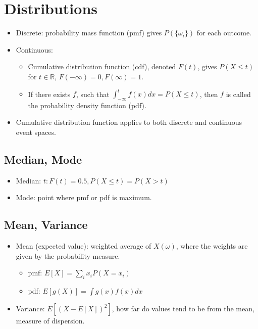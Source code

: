 \documentclass[letterpaper,10pt]{article}
\begin{document}
\section{Distributions}

\begin{itemize}
	\item Discrete: probability mass function (pmf) gives $P(\{\omega_i\})$ for each outcome.
	\item Continuous:
	\begin{itemize}
		\item Cumulative distribution function (cdf), denoted $F(t)$, gives $P(X \leq t)$ for $t\in\mathbb{R}$, $F(-\infty)=0, F(\infty)=1$.
		\item If there exists $f$, such that $\int_{-\infty}^{t}f(x)dx=P(X\leq t)$, then $f$ is called the probability density function (pdf).
	\end{itemize}
	\item Cumulative distribution function applies to both discrete and continuous event spaces.
\end{itemize}

\subsection{Median, Mode}

\begin{itemize}
	\item Median: $t:F(t)=0.5, P(X\leq t)=P(X>t)$
	\item Mode: point where pmf or pdf is maximum.
\end{itemize}

\subsection{Mean, Variance}

\begin{itemize}
	\item Mean (expected value): weighted average of $X(\omega)$, where the weights are given by the probability measure.
	\begin{itemize}
		\item pmf: $E[X]=\sum_i{x_iP(X=x_i)}$
		\item pdf: $E[g(X)]=\int {g(x)f(x)dx}$
	\end{itemize}
	\item Variance: $E[(X-E[X])^2]$, how far do values tend to be from the mean, measure of dispersion. 
\end{itemize}
\end{document}
